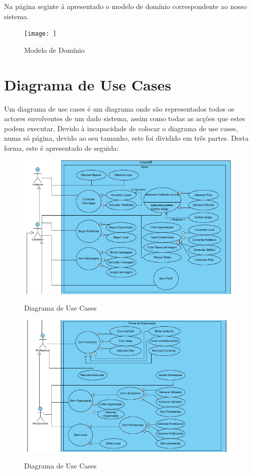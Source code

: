﻿\documentclass[12pt,a4paper]{article}
\begin{document}
Na página seginte á apresentado o modelo de domínio correspondente ao nosso sistema.
\newpage

\begin{figure}[h!]
\centering
\texttt{[image: ]}
\label{modelo domínio}
\caption{Modelo de Domínio}
\end{figure}


\newpage
\section{Diagrama de Use Cases}
Um diagrama de use cases é um diagrama onde são representados todos os actores envolventes de um dado sistema, assim como todas as acções que estes podem executar. Devido à incapacidade de colocar o diagrama de use cases, numa só página, devido ao seu tamanho, este foi dividido em três partes. Desta forma, este é apresentado de seguida:\\

\begin{figure}[h!]
\centering
\includegraphics[scale=1]{usecase/geral1}
\label{usecase}
\caption{Diagrama de Use Cases}
\end{figure}

\begin{figure}[h!]
\centering
\includegraphics[scale=1]{usecase/geral2}
\label{usecase}
\caption{Diagrama de Use Cases}
\end{figure}
\end{document}
